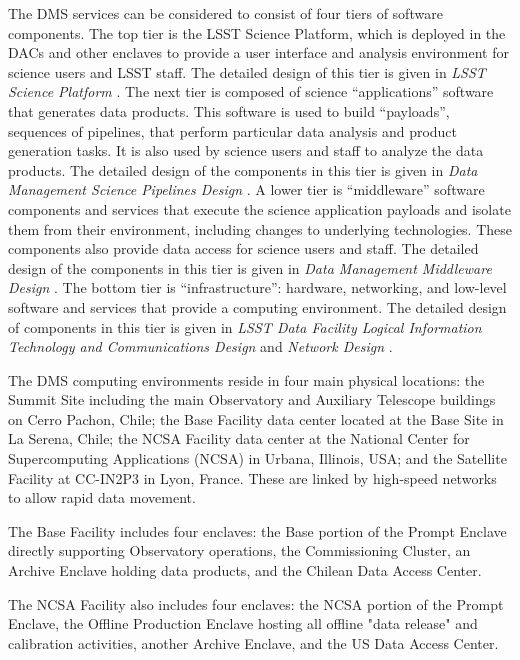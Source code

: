 \documentclass[DM,toc,lsstdraft]{lsstdoc}
\begin{document}
The DMS services can be considered to consist of four tiers of software
components. The top tier is the LSST Science Platform, which is deployed
in the DACs and other enclaves to provide a user
interface and analysis environment for science users and LSST staff. The
detailed design of this tier is given in \textit{LSST Science Platform} . The next
tier is composed of science ``applications'' software that generates
data products. This software is used to build ``payloads'', sequences of
pipelines, that perform particular data analysis and product generation
tasks. It is also used by science users and staff to analyze the data
products. The detailed design of the components in this tier is given in
\textit{Data Management Science Pipelines Design} . A lower tier is
``middleware'' software components and services that execute the science
application payloads and isolate them from their environment, including
changes to underlying technologies. These components also provide data
access for science users and staff. The detailed design of the
components in this tier is given in \textit{Data Management Middleware Design} .
The bottom tier is ``infrastructure'': hardware, networking,
and low-level software and services that provide a computing
environment. The detailed design of components in this tier is given in
\textit{LSST Data Facility Logical Information Technology and Communications Design}  and \textit{Network Design} .

The DMS computing environments reside in four main physical locations:
the Summit Site including the main Observatory and Auxiliary Telescope
buildings on Cerro Pachon, Chile; the Base Facility data center located
at the Base Site in La Serena, Chile; the NCSA Facility data center
at the National Center for Supercomputing Applications (NCSA) in Urbana,
Illinois, USA; and the Satellite Facility at CC-IN2P3 in Lyon,
France. These are linked by high-speed networks to allow rapid data
movement.

The Base Facility includes four enclaves: the Base portion of the Prompt Enclave directly supporting Observatory operations, the Commissioning Cluster, an Archive Enclave holding data products, and the Chilean Data Access Center.

The NCSA Facility also includes four enclaves: the NCSA portion of the Prompt Enclave, the Offline Production Enclave hosting all offline "data release" and calibration activities, another Archive Enclave, and the US Data Access Center.
\end{document}

